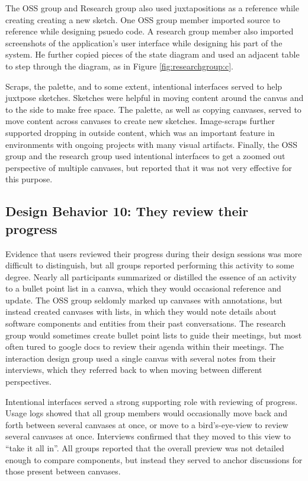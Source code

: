 The OSS group and Research group also used juxtapositions as a reference while creating creating a new sketch. One OSS group member imported source to reference while designing psuedo code. A research group member also imported screenshots of the application's user interface while designing his part of the system. He further copied pieces of the state diagram and used an adjacent table to step through the diagram, as in Figure \ref{fig:researchgroup:c}.

Scraps, the palette, and to some extent, intentional interfaces served to help juxtpose sketches. Sketches were helpful in moving content around the canvas and to the side to make free space. The palette, as well as copying canvases, served to move content across canvases to create new sketches. Image-scraps further supported dropping in outside content, which was an important feature in environments with ongoing projects with many visual artifacts. Finally, the OSS group and the research group used intentional interfaces to get a zoomed out perspective of multiple canvases, but reported that it was not very effective for this purpose.

\subsection{Design Behavior 10: They review their progress}

Evidence that users reviewed their progress during their design sessions was more difficult to distinguish, but all groups reported performing this activity to some degree. Nearly all participants summarized or distilled the essence of an activity to a bullet point list in a canvsa, which they would occasional reference and update. The OSS group seldomly marked up canvases with annotations, but instead created canvases with lists, in which they would note details about software components and entities from their past conversations. The research group would sometimes create bullet point lists to guide their meetings, but most often tured to google docs to review their agenda within their meetings. The interaction design group used a single canvas with several notes from their interviews, which they referred back to when moving between different perspectives. 

Intentional interfaces served a strong supporting role with reviewing of progress. Usage logs showed that all group members would occasionally move back and forth between several canvases at once, or move to a bird's-eye-view to review several canvases at once. Interviews confirmed that they moved to this view to ``take it all in''. All groups reported that the overall preview was not detailed enough to compare components, but instead they served to anchor discussions for those present between canvases.

